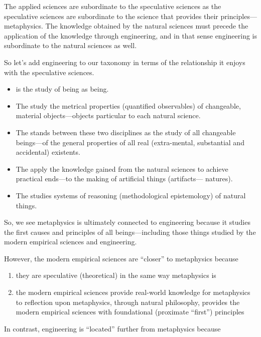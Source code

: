 The applied sciences are subordinate to the speculative sciences as the speculative sciences are subordinate to the science that provides their principles---metaphysics. The knowledge obtained by the natural sciences must precede the application of the knowledge through engineering, and in that sense engineering is subordinate to the natural sciences as well.

So let's add engineering to our taxonomy in terms of the relationship it enjoys with the speculative sciences.

\begin{itemize}
\item {} is the study of being as being.
\item The  study the metrical properties (quantified observables) of changeable, material objects---objects particular to each natural science.
\item The  stands between these two disciplines as the study of all changeable beings---of the general properties of all real (extra-mental, substantial and accidental) existents.
\item The  apply the knowledge gained from the natural sciences to achieve practical ends---to the making of artificial things (artifacts--- natures).
\item The  studies systems of reasoning (methodological epistemology) of natural things.
\end{itemize}

So, we see metaphysics is ultimately connected to engineering because it studies the first causes and principles of all beings---including those things studied by the modern empirical sciences and engineering.

However, the modern empirical sciences are ``closer'' to metaphysics because

\begin{enumerate}
\item they are speculative (theoretical) in the same way metaphysics is
\item the modern empirical sciences provide real-world knowledge for metaphysics to reflection upon
metaphysics, through natural philosophy, provides the modern empirical sciences with foundational (proximate ``first'') principles
\end{enumerate}

In contrast, engineering is ``located'' further from metaphysics because

